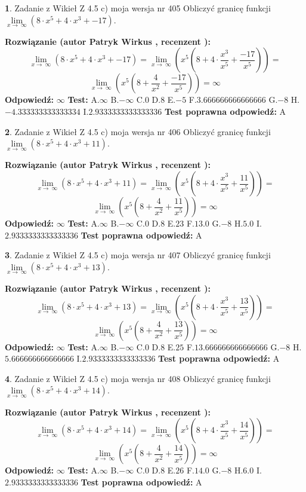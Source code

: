 \documentclass[12pt, a4paper]{article}
\theoremstyle{definition} %
\newtheorem{zad}{}
\newcommand{\zadStart}[1]{\begin{zad}#1\newline}
\newcommand{\zadStop}{\end{zad}}
\newcommand{\rozwStart}[2]{\noindent \textbf{Rozwiązanie (autor #1 , recenzent #2): }\newline}
\newcommand{\rozwStop}{\newline}
\newcommand{\odpStart}{\noindent \textbf{Odpowiedź:}\newline}
\newcommand{\odpStop}{\newline}
\newcommand{\testStart}{\noindent \textbf{Test:}\newline}
\newcommand{\testStop}{\newline}
\newcommand{\kluczStart}{\noindent \textbf{Test poprawna odpowiedź:}\newline}
\newcommand{\kluczStop}{\newline}
\begin{document}
\zadStart{Zadanie z Wikieł Z 4.5 c) moja wersja nr 405}
Obliczyć granicę funkcji  $\lim\limits_{x\to\ \infty}(8 \cdot x^{5}+4 \cdot x^{3}+-17)$.
\zadStop
\rozwStart{Patryk Wirkus}{}
$$\lim\limits_{x\to\ \infty}(8 \cdot x^{5}+4 \cdot x^{3}+-17) = \lim\limits_{x\to\ \infty}(x^{5}(8 +4 \cdot \frac{x^{3}}{x^{5}}+\frac{-17}{x^{5}})) =$$ $$\lim\limits_{x\to\ \infty}(x^{5}(8 +\frac{4}{x^{2}}+\frac{-17}{x^{5}})) =\infty$$
\rozwStop
\odpStart
$\infty$
\odpStop
\testStart
A.$\infty$ B.$-\infty$ C.$0$ D.$8$ E.$-5$
F.$3.666666666666666$ G.$-8$
H.$-4.333333333333334$
I.$2.9333333333333336$
\testStop
\kluczStart
A
\kluczStop



\zadStart{Zadanie z Wikieł Z 4.5 c) moja wersja nr 406}
Obliczyć granicę funkcji  $\lim\limits_{x\to\ \infty}(8 \cdot x^{5}+4 \cdot x^{3}+11)$.
\zadStop
\rozwStart{Patryk Wirkus}{}
$$\lim\limits_{x\to\ \infty}(8 \cdot x^{5}+4 \cdot x^{3}+11) = \lim\limits_{x\to\ \infty}(x^{5}(8 +4 \cdot \frac{x^{3}}{x^{5}}+\frac{11}{x^{5}})) =$$ $$\lim\limits_{x\to\ \infty}(x^{5}(8 +\frac{4}{x^{2}}+\frac{11}{x^{5}})) =\infty$$
\rozwStop
\odpStart
$\infty$
\odpStop
\testStart
A.$\infty$ B.$-\infty$ C.$0$ D.$8$ E.$23$
F.$13.0$ G.$-8$
H.$5.0$
I.$2.9333333333333336$
\testStop
\kluczStart
A
\kluczStop



\zadStart{Zadanie z Wikieł Z 4.5 c) moja wersja nr 407}
Obliczyć granicę funkcji  $\lim\limits_{x\to\ \infty}(8 \cdot x^{5}+4 \cdot x^{3}+13)$.
\zadStop
\rozwStart{Patryk Wirkus}{}
$$\lim\limits_{x\to\ \infty}(8 \cdot x^{5}+4 \cdot x^{3}+13) = \lim\limits_{x\to\ \infty}(x^{5}(8 +4 \cdot \frac{x^{3}}{x^{5}}+\frac{13}{x^{5}})) =$$ $$\lim\limits_{x\to\ \infty}(x^{5}(8 +\frac{4}{x^{2}}+\frac{13}{x^{5}})) =\infty$$
\rozwStop
\odpStart
$\infty$
\odpStop
\testStart
A.$\infty$ B.$-\infty$ C.$0$ D.$8$ E.$25$
F.$13.666666666666666$ G.$-8$
H.$5.666666666666666$
I.$2.9333333333333336$
\testStop
\kluczStart
A
\kluczStop



\zadStart{Zadanie z Wikieł Z 4.5 c) moja wersja nr 408}
Obliczyć granicę funkcji  $\lim\limits_{x\to\ \infty}(8 \cdot x^{5}+4 \cdot x^{3}+14)$.
\zadStop
\rozwStart{Patryk Wirkus}{}
$$\lim\limits_{x\to\ \infty}(8 \cdot x^{5}+4 \cdot x^{3}+14) = \lim\limits_{x\to\ \infty}(x^{5}(8 +4 \cdot \frac{x^{3}}{x^{5}}+\frac{14}{x^{5}})) =$$ $$\lim\limits_{x\to\ \infty}(x^{5}(8 +\frac{4}{x^{2}}+\frac{14}{x^{5}})) =\infty$$
\rozwStop
\odpStart
$\infty$
\odpStop
\testStart
A.$\infty$ B.$-\infty$ C.$0$ D.$8$ E.$26$
F.$14.0$ G.$-8$
H.$6.0$
I.$2.9333333333333336$
\testStop
\kluczStart
A
\kluczStop
\end{document}
